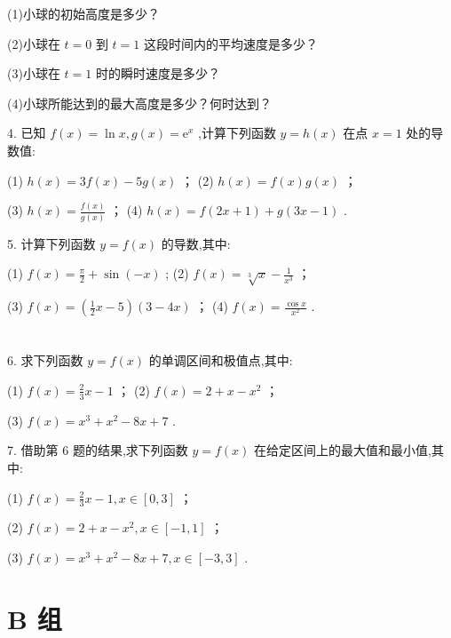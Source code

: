\documentclass[10pt]{article}
\begin{document}
(1)小球的初始高度是多少？

(2)小球在 \(t = 0\) 到 \(t = 1\) 这段时间内的平均速度是多少？

(3)小球在 \(t = 1\) 时的瞬时速度是多少？

(4)小球所能达到的最大高度是多少？何时达到？

4. 已知 \(f\left( x\right)  = \ln x,g\left( x\right)  = {\mathrm{e}}^{x}\) ,计算下列函数 \(y = h\left( x\right)\) 在点 \(x = 1\) 处的导数值:

(1) \(h\left( x\right)  = {3f}\left( x\right)  - {5g}\left( x\right)\) ； (2) \(h\left( x\right)  = f\left( x\right) g\left( x\right)\) ；

(3) \(h\left( x\right)  = \frac{f\left( x\right) }{g\left( x\right) }\) ； (4) \(h\left( x\right)  = f\left( {{2x} + 1}\right)  + g\left( {{3x} - 1}\right)\) .

5. 计算下列函数 \(y = f\left( x\right)\) 的导数,其中:

(1) \(f\left( x\right)  = \frac{\pi }{2} + \sin \left( {-x}\right)\) ; (2) \(f\left( x\right)  = \sqrt[3]{x} - \frac{1}{{x}^{3}}\) ；

(3) \(f\left( x\right)  = \left( {\frac{1}{2}x - 5}\right) \left( {3 - {4x}}\right)\) ； (4) \(f\left( x\right)  = \frac{\cos x}{{x}^{2}}\) .

\section*{}

6. 求下列函数 \(y = f\left( x\right)\) 的单调区间和极值点,其中:

(1) \(f\left( x\right)  = \frac{2}{3}x - 1\) ； (2) \(f\left( x\right)  = 2 + x - {x}^{2}\) ；

(3) \(f\left( x\right)  = {x}^{3} + {x}^{2} - {8x} + 7\) .

7. 借助第 6 题的结果,求下列函数 \(y = f\left( x\right)\) 在给定区间上的最大值和最小值,其中:

(1) \(f\left( x\right)  = \frac{2}{3}x - 1,x \in  \left\lbrack  {0,3}\right\rbrack\) ；

(2) \(f\left( x\right)  = 2 + x - {x}^{2},x \in  \left\lbrack  {-1,1}\right\rbrack\) ；

(3) \(f\left( x\right)  = {x}^{3} + {x}^{2} - {8x} + 7,x \in  \left\lbrack  {-3,3}\right\rbrack\) .

\section*{B 组}
\end{document}
